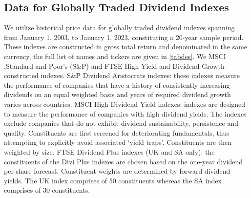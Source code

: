 \documentclass[11pt,preprint, authoryear]{elsarticle}
\numberwithin{equation}{section}
\numberwithin{figure}{section}
\numberwithin{table}{section}
\begin{document}
\hypertarget{data-for-globally-traded-dividend-indexes}{%
\subsection{\texorpdfstring{Data for Globally Traded Dividend
Indexes\label{int}}{Data for Globally Traded Dividend Indexes}}\label{data-for-globally-traded-dividend-indexes}}

We utilize historical price data for globally traded dividend indexes
spanning from January 1, 2003, to January 1, 2023, constituting a
20-year sample period. These indexes are constructed in gross total
return and denominated in the same currency, the full list of names and
tickers are given in \ref{tabdes}. We MSCI ,Standard and Poor's (S\&P)
and FTSE High Yield and Dividend Growth constructed indexes. S\&P
Dividend Aristocrats indexes: these indexes measure the performance of
companies that have a history of consistently increasing dividends on an
equal weighted basis and years of required dividend growth varies across
countries. MSCI High Dividend Yield indexes: indexes are designed to
measure the performance of companies with high dividend yields. The
indexes exclude companies that do not exhibit dividend sustainability,
persistence and quality. Constituents are first screened for
deteriorating fundamentals, thus attempting to explicitly avoid
associated `yield traps'. Constituents are then weighted by size. FTSE
Dividend Plus indexes (UK and SA only): the constituents of the Divi
Plus indexes are chosen based on the one-year dividend per share
forecast. Constituent weights are determined by forward dividend yields.
The UK index comprises of 50 constituents whereas the SA index comprises
of 30 constituents.
\end{document}

